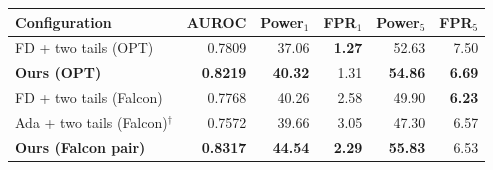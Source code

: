 \begin{tabular}{@{}lrrrrr@{}}
\toprule
Configuration & AUROC & Power$_1$ & FPR$_1$ & Power$_5$ & FPR$_5$ \\
\midrule
FD + two tails (OPT) & 0.7809 & 37.06 & \textbf{1.27} & 52.63 & 7.50 \\
\textbf{Ours (OPT)} & \textbf{0.8219} & \textbf{40.32} & 1.31 & \textbf{54.86} & \textbf{6.69} \\
\midrule
FD + two tails (Falcon) & 0.7768 & 40.26 & 2.58 & 49.90 & \textbf{6.23} \\
Ada + two tails (Falcon)$^\dagger$ & 0.7572 & 39.66 & 3.05 & 47.30 & 6.57 \\
\textbf{Ours (Falcon pair)} & \textbf{0.8317} & \textbf{44.54} & \textbf{2.29} & \textbf{55.83} & 6.53 \\
\bottomrule
\end{tabular}
